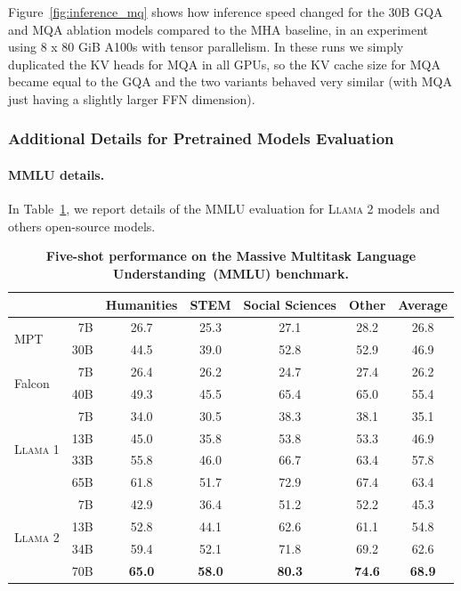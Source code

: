 \documentclass{article}
\newcommand{\anise}{\textsc{Llama 1}\xspace}
\newcommand{\cinnamon}{\textsc{Llama 2}\xspace}
\begin{document}
Figure~\ref{fig:inference_mq} shows how inference speed changed for the 30B GQA and MQA ablation models compared to the MHA baseline, in an experiment using 8 x 80 GiB A100s with tensor parallelism. In these runs we simply duplicated the KV heads for MQA in all GPUs, so the KV cache size for MQA became equal to the GQA and the two variants behaved very similar (with MQA just having a slightly larger FFN dimension).

\subsubsection{Additional Details for Pretrained Models Evaluation}
\label{app:pretrained_model_evals}
\paragraph{MMLU details.} In Table~\ref{tab:MMLU_detail}, we report details of the MMLU \citep{Hendrycks2020MeasuringMM} evaluation for \cinnamon models and others open-source models.

\begin{table}[htbp]
  \centering
  \setlength{\tabcolsep}{5pt}
  \begin{tabular}{lrccccc}
  \toprule
  & & Humanities & STEM & Social Sciences & Other & Average \\
  \midrule
  \multirow{2}{*}{MPT}
    & 7B & 26.7 & 25.3 & 27.1 & 28.2 & 26.8 \\
    & 30B & 44.5 & 39.0 & 52.8 & 52.9 & 46.9 \\
  \midrule    
  \multirow{2}{*}{Falcon}
    & 7B &  26.4 & 26.2 & 24.7 & 27.4 & 26.2 \\
    & 40B & 49.3 & 45.5 & 65.4 & 65.0 & 55.4 \\  
  \midrule      
  \multirow{4}{*}{\anise}
    & 7B &  34.0 & 30.5 & 38.3 & 38.1 & 35.1 \\
    & 13B & 45.0 & 35.8 & 53.8 & 53.3 & 46.9 \\
    & 33B & 55.8 & 46.0 & 66.7 & 63.4 & 57.8 \\    
    & 65B & 61.8 & 51.7 & 72.9 & 67.4 & 63.4 \\
  \midrule
  \multirow{4}{*}{\cinnamon}
    & 7B &  42.9 & 36.4 & 51.2 & 52.2 & 45.3 \\
    & 13B & 52.8 & 44.1 & 62.6 & 61.1 & 54.8 \\
    & 34B & 59.4 & 52.1 & 71.8 & 69.2 & 62.6 \\    
    & 70B & \bf{65.0} & \bf{58.0} & \bf{80.3} & \bf{74.6} & \bf{68.9} \\  
  \bottomrule
  \end{tabular}
  \caption{
  \textbf{Five-shot performance on the Massive Multitask 
Language Understanding~(MMLU) benchmark.}
  \label{tab:MMLU_detail}
  }
\end{table}
\end{document}
